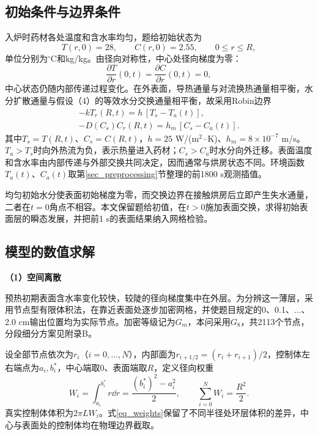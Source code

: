 \subsection{初始条件与边界条件}
入炉时药材各处温度和含水率均匀，题给初始状态为
\begin{equation}\label{eq_initial}
T(r,0)=28,\qquad C(r,0)=2.55,\qquad 0\le r\le R,
\end{equation}
单位分别为$^\circ$C和kg/kg。由径向对称性，中心处径向梯度为零：
\[
\frac{\partial T}{\partial r}(0,t)
=\frac{\partial C}{\partial r}(0,t)=0,
\]
中心状态仍随内部传递过程变化。在外表面，导热通量与对流换热通量相平衡，水分扩散通量与假设（4）的等效水分交换通量相平衡，故采用Robin边界
\begin{equation}\label{eq_robin}
\begin{gathered}
-kT_r(R,t)=h\,[T_s-T_a(t)],\\
-D(C_s)C_r(R,t)=h_m\,[C_s-C_a(t)].
\end{gathered}
\end{equation}
其中$T_s=T(R,t)$、$C_s=C(R,t)$，$h=25$ W/(m$^2\cdot$K)、$h_m=8\times10^{-7}$ m/s。$T_a>T_s$时向外热流为负，表示热量进入药材；$C_s>C_a$时水分向外迁移。表面温度和含水率由内部传递与外部交换共同决定，因而通常与烘房状态不同。环境函数$T_a(t)$、$C_a(t)$取第\ref{sec_preprocessing}节整理的前1800 s观测插值。

均匀初始水分使表面初始梯度为零，而交换边界在接触烘房后立即产生失水通量，二者在$t=0$角点不相容。本文保留题给初值，在$t>0$施加表面交换，求得初始表面层的瞬态发展，并把前1 s的表面结果纳入网格检验。

\subsection{模型的数值求解}
\medskip
\noindent\textbf{（1）空间离散}

预热初期表面含水率变化较快，较陡的径向梯度集中在外层。为分辨这一薄层，采用节点型有限体积法，在靠近表面处逐步加密网格，并使题目规定的0、0.1、$\ldots$、2.0 cm输出位置均为实际节点。加密等级记为$G_m$，本问采用$G_8$，共2113个节点，分段细分方案见附录B。

设全部节点依次为$r_i$（$i=0,\ldots,N$），内部面为$r_{i+1/2}=(r_i+r_{i+1})/2$，控制体左右端点为$a_i,b_i^*$，中心端取0、表面端取$R$，定义径向权重
\begin{equation}\label{eq_weights}
W_i=\int_{a_i}^{b_i^*}r\dd r=\frac{(b_i^*)^2-a_i^2}{2},
\qquad \sum_{i=0}^NW_i=\frac{R^2}{2}.
\end{equation}
真实控制体体积为$2\pi LW_i$。式\eqref{eq_weights}保留了不同半径处环层体积的差异，中心与表面处的控制体均在物理边界截取。

